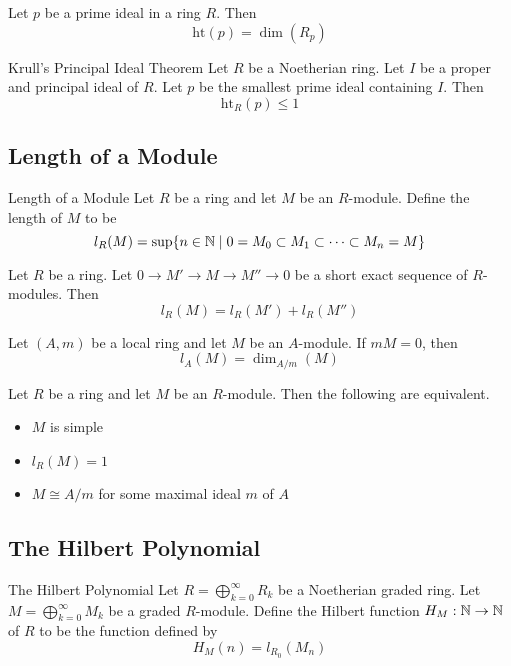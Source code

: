 \documentclass[a4paper]{article}
\begin{document}
\begin{lmm}{}{} Let $p$ be a prime ideal in a ring $R$. Then $$\text{ht}(p)=\dim(R_p)$$ 
\end{lmm}

\begin{thm}{Krull's Principal Ideal Theorem}{} Let $R$ be a Noetherian ring. Let $I$ be a proper and principal ideal of $R$. Let $p$ be the smallest prime ideal containing $I$. Then $$\text{ht}_R(p)\leq 1$$
\end{thm}

\subsection{Length of a Module}
\begin{defn}{Length of a Module}{} Let $R$ be a ring and let $M$ be an $R$-module. Define the length of $M$ to be $$l_R(M)=\text{sup}\{n\in\mathbb{N}\;|\;0=M_0\subset M_1\subset\cdots\subset M_n=M\}$$
\end{defn}

\begin{lmm}{}{} Let $R$ be a ring. Let $0\to M'\to M\to M''\to 0$ be a short exact sequence of $R$-modules. Then $$l_R(M)=l_R(M')+l_R(M'')$$
\end{lmm}

\begin{lmm}{}{} Let $(A,m)$ be a local ring and let $M$ be an $A$-module. If $mM=0$, then $$l_A(M)=\dim_{A/m}(M)$$
\end{lmm}

\begin{prp}{}{} Let $R$ be a ring and let $M$ be an $R$-module. Then the following are equivalent. 
\begin{itemize}
\item $M$ is simple
\item $l_R(M)=1$
\item $M\cong A/m$ for some maximal ideal $m$ of $A$
\end{itemize}
\end{prp}

\subsection{The Hilbert Polynomial}
\begin{defn}{The Hilbert Polynomial}{} Let $R=\bigoplus_{k=0}^\infty R_k$ be a Noetherian graded ring. Let $M=\bigoplus_{k=0}^\infty M_k$ be a graded $R$-module. Define the Hilbert function $H_M:\mathbb{N}\to\mathbb{N}$ of $R$ to be the function defined by $$H_M(n)=l_{R_0}(M_n)$$
\end{defn}
\end{document}
